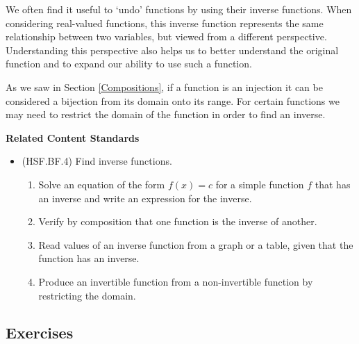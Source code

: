\documentclass[
]{book}
\providecommand{\tightlist}{%
  \setlength{\itemsep}{0pt}\setlength{\parskip}{0pt}}
\newenvironment{standards}{}{}
\theoremstyle{definition}
\theoremstyle{definition}
\theoremstyle{definition}
\theoremstyle{definition}
\theoremstyle{remark}
\begin{document}
We often find it useful to `undo' functions by using their inverse functions. When considering real-valued functions, this inverse function represents the same relationship between two variables, but viewed from a different perspective. Understanding this perspective also helps us to better understand the original function and to expand our ability to use such a function.

As we saw in Section \ref{Compositions}, if a function is an injection it can be considered a bijection from its domain onto its range. For certain functions we may need to restrict the domain of the function in order to find an inverse.

\begin{standards}

\begin{center}
\textbf{Related Content Standards}

\end{center}

\begin{itemize}
\tightlist
\item
  (HSF.BF.4) Find inverse functions.

  \begin{enumerate}
  \def\labelenumi{\alph{enumi}.}
  \tightlist
  \item
    Solve an equation of the form \(f(x) = c\) for a simple function \(f\) that has an inverse and write an expression for the inverse.
  \item
    Verify by composition that one function is the inverse of another.
  \item
    Read values of an inverse function from a graph or a table, given that the function has an inverse.
  \item
    Produce an invertible function from a non-invertible function by restricting the domain.
  \end{enumerate}
\end{itemize}

\end{standards}

\hypertarget{exercises-27}{%
\subsection{Exercises}\label{exercises-27}}
\end{document}
